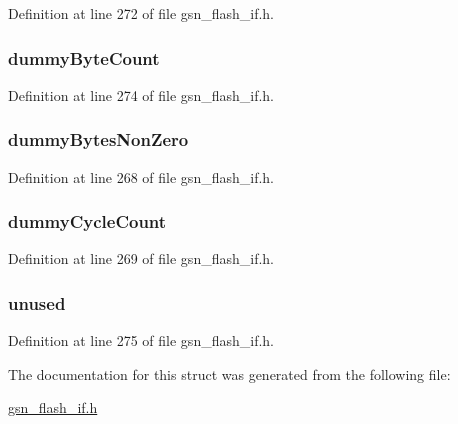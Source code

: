 Definition at line 272 of file gsn\_\-flash\_\-if.h.

\hypertarget{a00080_a21d61166cb8456ab28a25eb4f6f81a99}{
\subsubsection[{dummyByteCount}]{ {\bf dummyByteCount}}}
\label{a00080_a21d61166cb8456ab28a25eb4f6f81a99}


Definition at line 274 of file gsn\_\-flash\_\-if.h.

\hypertarget{a00080_abbd697f4944fb9099180431841727d57}{
\subsubsection[{dummyBytesNonZero}]{ {\bf dummyBytesNonZero}}}
\label{a00080_abbd697f4944fb9099180431841727d57}


Definition at line 268 of file gsn\_\-flash\_\-if.h.

\hypertarget{a00080_afd1b19aa3a7ccfe803814c9f9c9a6267}{
\subsubsection[{dummyCycleCount}]{ {\bf dummyCycleCount}}}
\label{a00080_afd1b19aa3a7ccfe803814c9f9c9a6267}


Definition at line 269 of file gsn\_\-flash\_\-if.h.

\hypertarget{a00080_a2c3ace150ddcb10d297a6d30b67d6330}{
\subsubsection[{unused}]{ {\bf unused}}}
\label{a00080_a2c3ace150ddcb10d297a6d30b67d6330}


Definition at line 275 of file gsn\_\-flash\_\-if.h.



The documentation for this struct was generated from the following file:\begin{DoxyCompactItemize}
\item 
\hyperlink{a00501}{gsn\_\-flash\_\-if.h}\end{DoxyCompactItemize}
